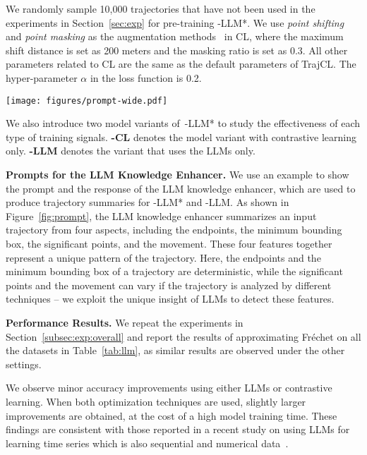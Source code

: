 We randomly sample 10,000 trajectories that have not been used in the experiments in Section~\ref{sec:exp} for pre-training \model-LLM*.
We use \emph{point shifting} and \emph{point masking} as the augmentation methods~\cite{trajcl} in CL, where the maximum shift distance is set as 200 meters and the masking ratio is set as 0.3.  All other parameters related to CL are the same as the default parameters of TrajCL. 
The hyper-parameter $\alpha$ in the loss function is 0.2.

\begin{figure*}[t!]
    \centering
    \texttt{[image: figures/prompt-wide.pdf]}
    \vspace{-2mm}
    \caption{A prompt and response example for the LLM  knowledge enhancer to generate trajectory summaries.}\label{fig:prompt}
    \vspace{-1mm}
\end{figure*}

We also introduce two model variants of~\model-LLM* to study the effectiveness of each type of training signals. 
\textbf{\model-CL} denotes the model variant with contrastive learning only. 
\textbf{\model-LLM} denotes the variant that uses the LLMs only.

\textbf{Prompts for the LLM Knowledge Enhancer.}
We use an example to show the prompt and the response of the LLM knowledge enhancer, which are used to produce trajectory summaries for \model-LLM* and \model-LLM. 
As shown in Figure~\ref{fig:prompt}, the LLM knowledge enhancer summarizes an input trajectory from four aspects, including the endpoints, the minimum bounding  box, the significant points, and the movement.
These four features together represent a unique pattern of the trajectory.
Here, the endpoints and the minimum bounding box of a trajectory are deterministic, while the significant points and the movement can vary if the trajectory is analyzed by different techniques -- we exploit the unique insight of LLMs to detect these features.





\textbf{Performance Results.} 
We repeat the experiments in Section~\ref{subsec:exp:overall} and report the results of approximating Fr\'echet on all the datasets in Table~\ref{tab:llm}, as similar results are observed under the other settings.



We observe minor accuracy improvements using either LLMs or contrastive learning. When both optimization techniques are used, slightly larger improvements are obtained, at the cost of a high model training time. These findings are consistent with those reported in a 
recent study on using LLMs for learning time series which is also sequential and numerical data~\cite{llmts_exppaper}.

